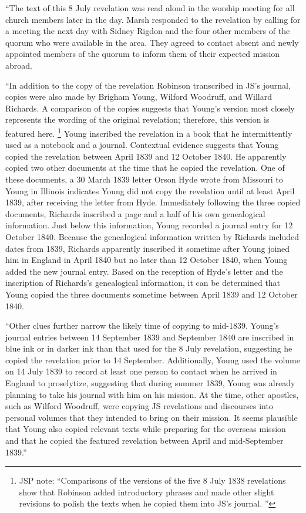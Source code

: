 			``The text of this 8 July revelation was read aloud in the worship meeting for all church members later in the day. Marsh responded to the revelation by calling for a meeting the next day with Sidney Rigdon and the four other members of the quorum who were available in the area. They agreed to contact absent and newly appointed members of the quorum to inform them of their expected mission abroad.
			
			``In addition to the copy of the revelation Robinson transcribed in JS's journal, copies were also made by Brigham Young, Wilford Woodruff, and Willard Richards. A comparison of the copies suggests that Young's version most closely represents the wording of the original revelation; therefore, this version is featured here.%
				\footnote{%
					JSP note: ``Comparisons of the versions of the five 8 July 1838 revelations show that Robinson added introductory phrases and made other slight revisions to polish the texts when he copied them into JS's journal. ''
					}
			Young inscribed the revelation in a book that he intermittently used as a notebook and a journal. Contextual evidence suggests that Young copied the revelation between April 1839 and 12 October 1840. He apparently copied two other documents at the time that he copied the revelation. One of these documents, a 30 March 1839 letter Orson Hyde wrote from Missouri to Young in Illinois indicates Young did not copy the revelation until at least April 1839, after receiving the letter from Hyde. Immediately following the three copied documents, Richards inscribed a page and a half of his own genealogical information. Just below this information, Young recorded a journal entry for 12 October 1840. Because the genealogical information written by Richards included dates from 1839, Richards apparently inscribed it sometime after Young joined him in England in April 1840 but no later than 12 October 1840, when Young added the new journal entry. Based on the reception of Hyde's letter and the inscription of Richards's genealogical information, it can be determined that Young copied the three documents sometime between April 1839 and 12 October 1840.
			
			``Other clues further narrow the likely time of copying to mid-1839. Young's journal entries between 14 September 1839 and September 1840 are inscribed in blue ink or in darker ink than that used for the 8 July revelation, suggesting he copied the revelation prior to 14 September. Additionally, Young used the volume on 14 July 1839 to record at least one person to contact when he arrived in England to proselytize, suggesting that during summer 1839, Young was already planning to take his journal with him on his mission. At the time, other apostles, such as Wilford Woodruff, were copying JS revelations and discourses into personal volumes that they intended to bring on their mission. It seems plausible that Young also copied relevant texts while preparing for the overseas mission and that he copied the featured revelation between April and mid-September 1839.''
			
